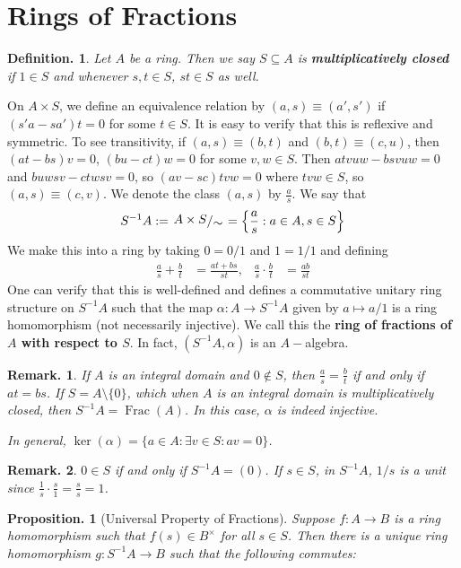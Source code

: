 \documentclass[11pt, a4paper]{memoir}
\theoremstyle{change}
\newtheorem{proposition}[theorem]{Proposition.}
\theoremstyle{plain}
\theoremstyle{nonumberplain}
\newtheorem{definition}{Definition.}
\newtheorem{remark}{Remark.}
\DeclareMathOperator{\Frac}{Frac}
\newcommand{\quot}[2]{\mathchoice{\left.\raisebox{0.12em}{$#1$}\middle/\raisebox{-0.12em}{$#2$}\right.}
                                 {\left.\raisebox{0.06em}{$#1$}\middle/\raisebox{-0.06em}{$#2$}\right.}
                                 {\left.\raisebox{0.02em}{$#1$}\middle/\raisebox{-0.02em}{$#2$}\right.}
                                 {\left.\raisebox{0em}{$#1$}\middle/\raisebox{0em}{$#2$}\right.}}
\numberwithin{equation}{section}
\begin{document}
\section{Rings of Fractions}
\begin{definition}
    Let $A$ be a ring.
    Then we say $S\subseteq A$ is \textbf{multiplicatively closed} if $1\in S$ and whenever $s,t\in S$, $st\in S$ as well.
\end{definition}
On $A\times S$, we define an equivalence relation by $(a,s)\equiv(a',s')$ if $(s'a-sa')t=0$ for some $t\in S$.
It is easy to verify that this is reflexive and symmetric.
To see transitivity, if $(a,s)\equiv(b,t)$ and $(b,t)\equiv(c,u)$, then $(at-bs)v=0$, $(bu-ct)w=0$ for some $v,w\in S$.
Then $atvuw-bsvuw=0$ and $buwsv-ctwsv=0$, so $(av-sc)tvw=0$ where $tvw\in S$, so $(a,s)\equiv(c,v)$.
We denote the class $(a,s)$ by $\frac{a}{s}$.
We say that
\begin{equation*}
    S^{-1}A:=\quot{A\times S}{\sim}=\left\{\frac{a}{s}:a\in A,s\in S\right\}
\end{equation*}
We make this into a ring by taking $0=0/1$ and $1=1/1$ and defining
\begin{align*}
    \frac{a}{s}+\frac{b}{t}&=\frac{at+bs}{st},&\frac{a}{s}\cdot\frac{b}{t}&=\frac{ab}{st}
\end{align*}
One can verify that this is well-defined and defines a commutative unitary ring structure on $S^{-1}A$ such that the map $\alpha:A\to S^{-1}A$ given by $a\mapsto a/1$ is a ring homomorphism (not necessarily injective).
We call this the \textbf{ring of fractions of $A$ with respect to $S$}.
In fact, $(S^{-1}A,\alpha)$ is an $A-$algebra.
\begin{remark}
    If $A$ is an integral domain and $0\notin S$, then $\frac{a}{s}=\frac{b}{t}$ if and only if $at=bs$.
    If $S=A\setminus\{0\}$, which when $A$ is an integral domain is multiplicatively closed, then $S^{-1}A=\Frac(A)$.
    In this case, $\alpha$ is indeed injective.

    In general, $\ker(\alpha)=\{a\in A:\exists v\in S:av=0\}$.
\end{remark}
\begin{remark}
    $0\in S$ if and only if $S^{-1}A=(0)$.
    If $s\in S$, in $S^{-1}A$, $1/s$ is a unit since $\frac{1}{s}\cdot\frac{s}{1}=\frac{s}{s}=1$.
\end{remark}
\begin{proposition}[Universal Property of Fractions]
    Suppose $f:A\to B$ is a ring homomorphism such that $f(s)\in B^\times$ for all $s\in S$.
    Then there is a unique ring homomorphism $g:S^{-1}A\to B$ such that the following commutes:
    \begin{center}
    \end{center}
\end{proposition}
\end{document}

